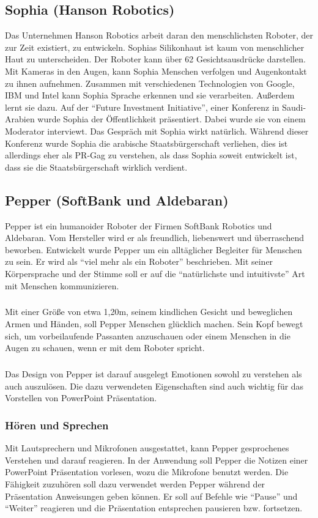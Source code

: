 \subsection{Sophia (Hanson Robotics)}
Das Unternehmen Hanson Robotics arbeit daran den menschlichsten Roboter, der zur
Zeit existiert, zu entwickeln. Sophias Silikonhaut ist kaum von menschlicher
Haut zu unterscheiden. Der Roboter kann über 62 Gesichtsausdrücke darstellen.
Mit Kameras in den Augen, kann Sophia Menschen verfolgen und Augenkontakt zu
ihnen aufnehmen. Zusammen mit verschiedenen Technologien von Google, IBM und
Intel kann Sophia Sprache erkennen und sie verarbeiten. Außerdem lernt sie
dazu. \cite{Harriet2016} Auf der "`Future Investment Initiative"', einer
Konferenz in Saudi-Arabien wurde Sophia der Öffentlichkeit präsentiert. Dabei
wurde sie von einem Moderator interviewt. Das Gespräch mit Sophia wirkt
natürlich. Während dieser Konferenz wurde Sophia die arabische
Staatsbürgerschaft verliehen, dies ist allerdings eher als PR-Gag zu verstehen,
als dass Sophia soweit entwickelt ist, dass sie die Staatsbürgerschaft wirklich
verdient. \cite{Welt2017}

\subsection{Pepper (SoftBank und Aldebaran)}\label{sec:pepper}
Pepper ist ein humanoider Roboter der Firmen SoftBank Robotics und Aldebaran.
Vom Hersteller wird er als freundlich, liebenswert und überraschend beworben.
Entwickelt wurde Pepper um ein alltäglicher Begleiter für Menschen zu sein. Er
wird als "`viel mehr als ein Roboter"' beschrieben. Mit seiner Körpersprache und
der Stimme soll er auf die "`natürlichste und intuitivste"' Art mit Menschen
kommunizieren. \cite{SoftBank2018}

\subparagraph{}
Mit einer Größe von etwa 1,20m, seinem kindlichen Gesicht und beweglichen Armen
und Händen, soll Pepper Menschen glücklich machen. Sein Kopf bewegt sich, um
vorbeilaufende Passanten anzuschauen oder einem Menschen in die Augen zu
schauen, wenn er mit dem Roboter spricht. \cite{Markowitz2015}

\subparagraph{}
Das Design von Pepper ist darauf ausgelegt Emotionen sowohl zu verstehen als
auch auszulösen. Die dazu verwendeten Eigenschaften sind auch wichtig für das
Vorstellen von PowerPoint Präsentation.

\subsubsection{Hören und Sprechen}\label{sec:hoeren-und-sehen}
Mit Lautsprechern und Mikrofonen ausgestattet, kann Pepper gesprochenes
Verstehen und darauf reagieren. In der Anwendung soll Pepper die Notizen einer
PowerPoint Präsentation vorlesen, wozu die Mikrofone benutzt werden. Die
Fähigkeit zuzuhören soll dazu verwendet werden Pepper während der Präsentation
Anweisungen geben können. Er soll auf Befehle wie "`Pause"' und "`Weiter"'
reagieren und die Präsentation entsprechen pausieren bzw. fortsetzen.

